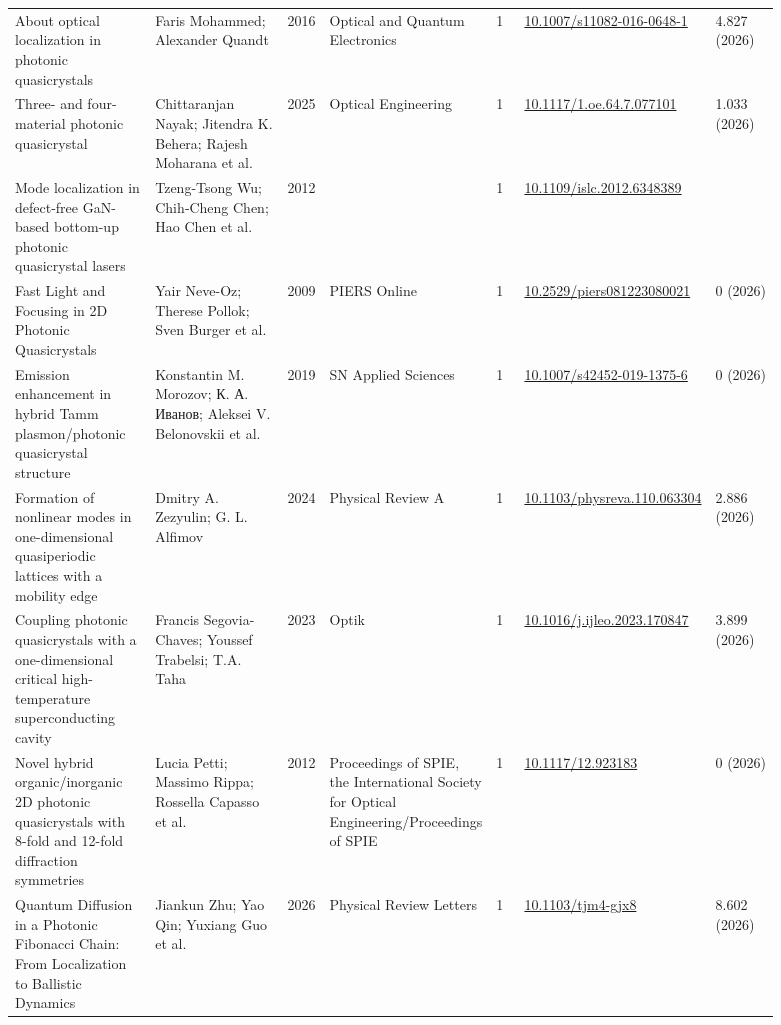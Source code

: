 \documentclass[10pt,a4paper]{article}
\begin{document}
{\begin{longtable}{p{0.192\linewidth}p{0.192\linewidth}p{0.043\linewidth}p{0.192\linewidth}p{0.043\linewidth}p{0.132\linewidth}p{0.096\linewidth}}
About optical localization in photonic quasicrystals & Faris Mohammed; Alexander Quandt & 2016 & Optical and Quantum Electronics & 1 & \href{https://doi.org/10.1007/s11082-016-0648-1}{10.1007/s11082-016-0648-1} & 4.827 (2026) \\
Three- and four-material photonic quasicrystal & Chittaranjan Nayak; Jitendra K. Behera; Rajesh Moharana et al. & 2025 & Optical Engineering & 1 & \href{https://doi.org/10.1117/1.oe.64.7.077101}{10.1117/1.oe.64.7.077101} & 1.033 (2026) \\
Mode localization in defect-free GaN-based bottom-up photonic quasicrystal lasers & Tzeng-Tsong Wu; Chih‐Cheng Chen; Hao Chen et al. & 2012 &  & 1 & \href{https://doi.org/10.1109/islc.2012.6348389}{10.1109/islc.2012.6348389} &  \\
Fast Light and Focusing in 2D Photonic Quasicrystals & Yair Neve-Oz; Therese Pollok; Sven Burger et al. & 2009 & PIERS Online & 1 & \href{https://doi.org/10.2529/piers081223080021}{10.2529/piers081223080021} & 0 (2026) \\
Emission enhancement in hybrid Tamm plasmon/photonic quasicrystal structure & Konstantin M. Morozov; К. А. Иванов; Aleksei V. Belonovskii et al. & 2019 & SN Applied Sciences & 1 & \href{https://doi.org/10.1007/s42452-019-1375-6}{10.1007/s42452-019-1375-6} & 0 (2026) \\
Formation of nonlinear modes in one-dimensional quasiperiodic lattices with a mobility edge & Dmitry A. Zezyulin; G. L. Alfimov & 2024 & Physical Review A & 1 & \href{https://doi.org/10.1103/physreva.110.063304}{10.1103/physreva.110.063304} & 2.886 (2026) \\
Coupling photonic quasicrystals with a one-dimensional critical high-temperature superconducting cavity & Francis Segovia-Chaves; Youssef Trabelsi; T.A. Taha & 2023 & Optik & 1 & \href{https://doi.org/10.1016/j.ijleo.2023.170847}{10.1016/j.ijleo.2023.170847} & 3.899 (2026) \\
Novel hybrid organic/inorganic 2D photonic quasicrystals with 8-fold and 12-fold diffraction symmetries & Lucia Petti; Massimo Rippa; Rossella Capasso et al. & 2012 & Proceedings of SPIE, the International Society for Optical Engineering/Proceedings of SPIE & 1 & \href{https://doi.org/10.1117/12.923183}{10.1117/12.923183} & 0 (2026) \\
Quantum Diffusion in a Photonic Fibonacci Chain: From Localization to Ballistic Dynamics & Jiankun Zhu; Yao Qin; Yuxiang Guo et al. & 2026 & Physical Review Letters & 1 & \href{https://doi.org/10.1103/tjm4-gjx8}{10.1103/tjm4-gjx8} & 8.602 (2026) \\

\end{longtable}}
\end{document}
